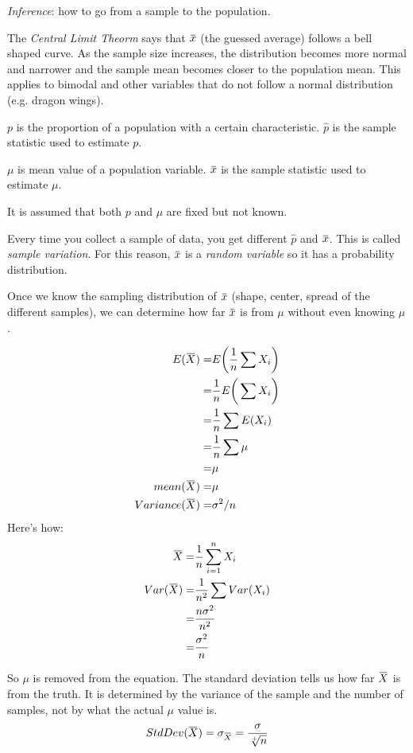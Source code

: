 \documentclass[11pt, oneside]{article}   	%
\newcommand{\overbar}[1]{\mkern 1.5mu\overline{\mkern-1.5mu#1\mkern-1.5mu}\mkern 1.5mu}
\begin{document}
\textit{Inference}: how to go from a sample to the population.

The \textit{Central Limit Theorm} says that $\overbar{x}$ (the guessed average) follows a bell shaped curve. As the sample size increases, the distribution becomes more normal and narrower and the sample mean becomes closer to the population mean. This applies to bimodal and other variables that do not follow a normal distribution (e.g. dragon wings). 

$p$ is the proportion of a population with a certain characteristic. $\hat{p}$ is the sample statistic used to estimate $p$.

$\mu$ is mean value of a population variable. $\overbar{x}$ is the sample statistic used to estimate $\mu$.

It is assumed that both $p$ and $\mu$ are fixed but not known.

Every time you collect a sample of data, you get different $\hat{p}$ and $\overbar{x}$. This is called \textit{sample variation}. For this reason, $\overbar{x}$ is a \textit{random variable} so it has a probability distribution. 

Once we know the sampling distribution of $\overbar{x}$ (shape, center, spread of the different samples), we can determine how far $\overbar{x}$ is from $\mu$ without even knowing $\mu$.

\begin{align*}
E(\overbar{X}) =& E\bigg(\frac{1}{n} \sum X_i  \bigg) \\
 =& \frac{1}{n}E\bigg(\sum X_i \bigg) \\
 =& \frac{1}{n}\sum E(X_i)\\
 =& \frac{1}{n}\sum \mu \\
 =& \mu \\
mean(\overbar{X}) =& \mu \\
Variance(\overbar{X}) =& \sigma^2 / n \\
\end{align*}
Here's how:
\begin{align*}
\overbar{X} = & \frac{1}{n}\sum \limits_{i=1}^{n} X_i \\
Var(\overbar{X}) =& \frac{1}{n^2} \sum Var(X_i) \\
	=& \frac{n\sigma^2}{n^2} \\
	=& \frac{\sigma^2}{n}
\end{align*}

So $\mu$ is removed from the equation.  The standard deviation tells us how far $\overbar{X}$ is from the truth. It is determined by the variance of the sample and the number of samples, not by what the actual $\mu$ value is.
\[
StdDev(\overbar{X}) = \sigma_{\overbar{X}} = \frac{\sigma}{\sqrt[+]{n}}
\]
\end{document}
